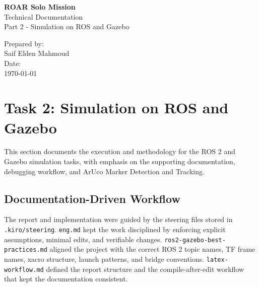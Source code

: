 \documentclass[12pt,a4paper]{article}
\begin{document}
\begin{titlepage}
    \centering
    \vspace*{2cm}
    
    {\Huge\bfseries ROAR Solo Mission}\\[0.5cm]
    {\LARGE Technical Documentation}\\[0.5cm]
    {\LARGE Part 2 - Simulation on ROS and Gazebo}\\[3cm]
    
    \vfill
    
    {\Large Prepared by:}\\[0.5cm]
    {\large Saif Elden Mahmoud}\\[3cm]
    
    {\Large Date:}\\[0.5cm]
    {\large \today}
    
    \vfill
    
\end{titlepage}

\tableofcontents
\newpage

\listoffigures
\newpage

\section{Task 2: Simulation on ROS and Gazebo}

This section documents the execution and methodology for the ROS 2 and Gazebo simulation tasks, with emphasis on the supporting documentation, debugging workflow, and ArUco Marker Detection and Tracking.

\subsection{Documentation-Driven Workflow}

The report and implementation were guided by the steering files stored in \texttt{.kiro/steering}. \texttt{eng.md} kept the work disciplined by enforcing explicit assumptions, minimal edits, and verifiable changes. \texttt{ros2-gazebo-best-practices.md} aligned the project with the correct ROS 2 topic names, TF frame names, xacro structure, launch patterns, and bridge conventions. \texttt{latex-workflow.md} defined the report structure and the compile-after-edit workflow that kept the documentation consistent.
\end{document}
